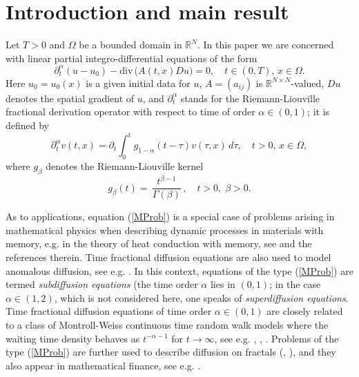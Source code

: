 \documentclass[10pt]{article}
\newcommand{\iR}{\mathbb{R}}
\begin{document}
\section{Introduction and main result}
Let $T>0$ and $\Omega$ be a bounded domain in $\iR^N$. In this paper
we are concerned with linear partial integro-differential equations
of the form
\begin{equation} \label{MProb}
\partial_t^\alpha (u-u_0)-\mbox{div}\,\big(A(t,x)Du\big)=0,\quad t\in (0,T),\,x\in
\Omega.
\end{equation}
Here $u_0=u_0(x)$ is a given initial data for $u$, $A=(a_{ij})$ is
$\iR^{N\times N}$-valued, $Du$ denotes the spatial gradient of $u$,
and $\partial_t^\alpha$ stands for the Riemann-Liouville fractional
derivation operator with respect to time of order $\alpha\in (0,1)$;
it is defined by
\[
\partial_t^\alpha v(t,x)=\partial_t\int_0^t
g_{1-\alpha}(t-\tau)v(\tau,x)\,d\tau,\quad t>0,\,x\in \Omega,
\]
where $g_\beta$ denotes the Riemann-Liouville kernel
\[
g_\beta(t)=\,\frac{t^{\beta-1}}{\Gamma(\beta)}\,,\quad
t>0,\;\beta>0.
\]

As to applications, equation (\ref{MProb}) is a special case of
problems arising in mathematical physics when describing dynamic
processes in materials with memory, e.g. in the theory of heat
conduction with memory, see \cite{JanI} and the references therein.
Time fractional diffusion equations are also used to model anomalous
diffusion, see e.g. \cite{Metz}. In this context, equations of the
type (\ref{MProb}) are termed {\em subdiffusion equations} (the time
order $\alpha$ lies in $(0,1)$; in the case $\alpha\in(1,2)$, which
is not considered here, one speaks of {\em superdiffusion
equations}. Time fractional diffusion equations of time order
$\alpha\in (0,1)$ are closely related to a class of Montroll-Weiss
continuous time random walk models where the waiting time density
behaves as $ t^{-\alpha-1}$ for $t\to \infty$, see e.g.
\cite{Hilfer1}, \cite{Hilfer2}, \cite{Metz}. Problems of the type
(\ref{MProb}) are further used to describe diffusion on fractals
(\cite{Metz}, \cite{Roma}), and they also appear in mathematical
finance, see e.g. \cite{Sca}.
\end{document}
